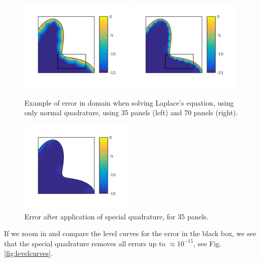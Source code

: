 \documentclass[a4paper,10pt]{article}
\begin{document}
\begin{figure}[ht]
    \begin{center}
        \includegraphics[width=0.49\textwidth]{Graphics/filled_error_panels35.png}
        \includegraphics[width =0.49\textwidth]{Graphics/filled_error_panels70.png}
    \end{center}
    \caption{Example of error in domain when solving Laplace's equation, using only normal quadrature, using 35 panels (left) and 70 panels (right).}
    \label{fig:normquad}
\end{figure}
\begin{figure}[ht]
    \begin{center}
        \includegraphics[width=0.49\textwidth]{Graphics/fillederror_SQ_panels35.png}
        \end{center}
    \caption{Error after application of special quadrature, for 35 panels.}
    \label{fig:specquad}
\end{figure}
If we zoom in and compare the level curves for the error in the black box, we see that the special quadrature removes all errors up to $\approx 10^{-15}$, see Fig. \ref{fig:levelcurves}. 
\end{document}
